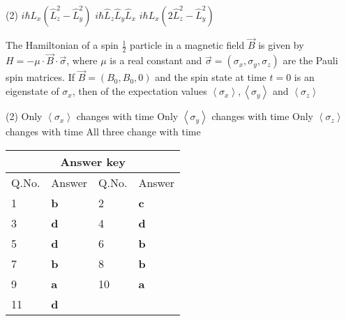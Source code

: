 \begin{enumerate}
\begin{minipage}{\textwidth}
\end{minipage}
\begin{tasks}(2)
	\task[\textbf{A.}] $i \hbar L_{x}\left(\hat{L}_{z}^{2}-\hat{L}_{y}^{2}\right)$
	\task[\textbf{B.}]$i \hbar \hat{L}_{z} \hat{L}_{y} \hat{L}_{x}$
	\task[\textbf{C.}] $i \hbar L_{x}\left(2 \hat{L}_{z}^{2}-\hat{L}_{y}^{2}\right)$
\end{tasks}
\begin{minipage}{\textwidth}
	\item The Hamiltonian of a spin $\frac{1}{2}$ particle in a magnetic field $\vec{B}$ is given by $H=-\mu \cdot \vec{B} \cdot \vec{\sigma}$, where $\mu$ is a real constant and $\vec{\sigma}=\left(\sigma_{x}, \sigma_{y}, \sigma_{z}\right)$ are the Pauli spin matrices. If $\vec{B}=\left(B_{0}, B_{0}, 0\right)$ and the spin state at time $t=0$ is an eigenstate of $\sigma_{x}$, then of the expectation values $\left\langle\sigma_{x}\right\rangle,\left\langle\sigma_{y}\right\rangle$ and $\left\langle\sigma_{z}\right\rangle$
\end{minipage}
\begin{tasks}(2)
	\task[\textbf{A.}] Only $\left\langle\sigma_{x}\right\rangle$ changes with time
	\task[\textbf{B.}] Only $\left\langle\sigma_{y}\right\rangle$ changes with time
	\task[\textbf{C.}]Only $\left\langle\sigma_{z}\right\rangle$ changes with time
	\task[\textbf{D.}]All three change with time
\end{tasks}
\end{enumerate}

\setlength\arrayrulewidth{1pt}
\begin{table}[H]
	\centering
	
	\begin{tabular}{|p{1.5cm}|p{1.5cm}||p{1.5cm}|p{1.5cm}|}
		\hline
		\multicolumn{4}{|c|}{\textbf{Answer key}}\\\hline\hline
		\rowcolor{ocrel}Q.No.&Answer&Q.No.&Answer\\\hline
		1&\textbf{b}&2&\textbf{c}\\\hline
		3&\textbf{d}&4&\textbf{d}\\\hline
		5&\textbf{d}&6&\textbf{b}\\\hline
		7&\textbf{b}&8&\textbf{b}\\\hline
		9&\textbf{a}&10&\textbf{a}\\\hline
		11&\textbf{d}&&\\\hline
	\end{tabular}
\end{table}



